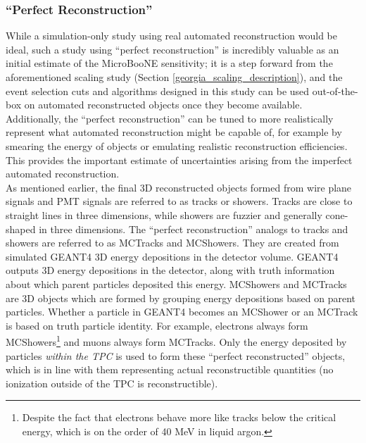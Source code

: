 \subsubsection{``Perfect Reconstruction''}\label{perfectreco_section}
While a simulation-only study using real automated reconstruction would be ideal, such a study using ``perfect reconstruction'' is incredibly valuable as an initial estimate of the MicroBooNE sensitivity; it is a step forward from the aforementioned scaling study (Section \ref{georgia_scaling_description}), and the event selection cuts and algorithms designed in this study can be used out-of-the-box on automated reconstructed objects once they become available. Additionally, the ``perfect reconstruction'' can be tuned to more realistically represent what automated reconstruction might be capable of, for example by smearing the energy of objects or emulating realistic reconstruction efficiencies. This provides the important estimate of uncertainties arising from the imperfect automated reconstruction.\\

As mentioned earlier, the final 3D reconstructed objects formed from wire plane signals and PMT signals are referred to as tracks or showers. Tracks are close to straight lines in three dimensions, while showers are fuzzier and generally cone-shaped in three dimensions. The ``perfect reconstruction'' analogs to tracks and showers are referred to as {\sc MCTracks} and {\sc MCShowers}. They are created from simulated {\sc GEANT4} 3D energy depositions in the detector volume. {\sc GEANT4} outputs 3D energy depositions in the detector, along with truth information about which parent particles deposited this energy. {\sc MCShowers} and {\sc MCTracks} are 3D objects which are formed by grouping energy depositions based on parent particles. Whether a particle in {\sc GEANT4} becomes an {\sc MCShower} or an {\sc MCTrack} is based on truth particle identity. For example, electrons always form {\sc MCShower}s\footnote{Despite the fact that electrons behave more like tracks below the critical energy, which is on the order of 40 MeV in liquid argon.} and muons always form {\sc MCTrack}s. Only the energy deposited by particles \textit{within the TPC} is used to form these ``perfect reconstructed'' objects, which is in line with them representing actual reconstructible quantities (no ionization outside of the TPC is reconstructible).\\

